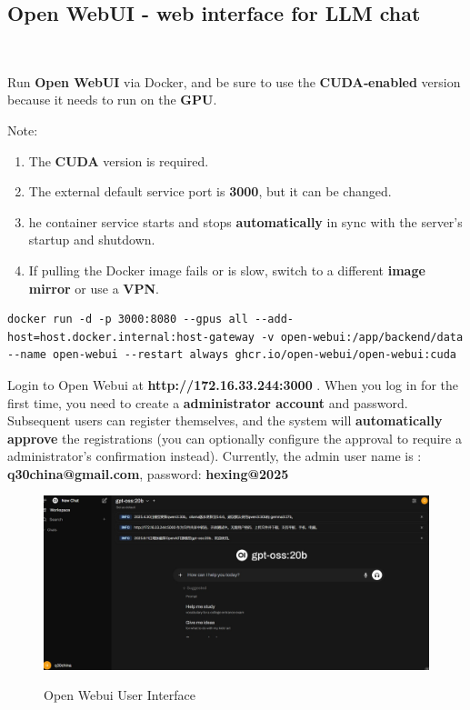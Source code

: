 
\subsection{ Open WebUI -  web interface for LLM chat}\

Run\textbf{ Open WebUI} via Docker, and be sure to use the\textbf{ CUDA‑enabled} version because it needs to run on the\textbf{ GPU}.

Note:
\begin{enumerate}
    \item The\textbf{ CUDA} version is required.
    \item The external default service port is \textbf{3000}, but it can be changed.
    \item he container service starts and stops \textbf{automatically} in sync with the server’s startup and shutdown.
    \item If pulling the Docker image fails or is slow, switch to a different\textbf{ image mirror} or use a \textbf{VPN}.
\end{enumerate}

\vspace{0.5cm}

\begin{lstlisting}
docker run -d -p 3000:8080 --gpus all --add-host=host.docker.internal:host-gateway -v open-webui:/app/backend/data --name open-webui --restart always ghcr.io/open-webui/open-webui:cuda
\end{lstlisting}

Login to Open Webui at \textbf{http://172.16.33.244:3000} . When you log in for the first time, you need to create a \textbf{administrator account} and password. Subsequent users can register themselves, and the system will \textbf{automatically approve} the registrations (you can optionally configure the approval to require a administrator’s confirmation instead). Currently, the admin user name is : \textbf{q30china@gmail.com}, password:\textbf{ hexing@2025}

\begin{figure}[H]
    \begin{center}
        \includegraphics[width=.95\linewidth]{res/open-webui.jpg}\\
        \caption{Open Webui User Interface }\label{open-webui}
    \end{center}
\end{figure} 

